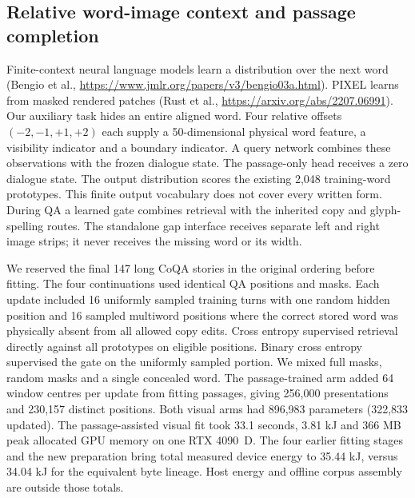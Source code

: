 \subsection*{Relative word-image context and passage completion}
Finite-context neural language models learn a distribution over the next word (Bengio et al., \url{https://www.jmlr.org/papers/v3/bengio03a.html}). PIXEL learns from masked rendered patches (Rust et al., \url{https://arxiv.org/abs/2207.06991}). Our auxiliary task hides an entire aligned word. Four relative offsets $(-2,-1,+1,+2)$ each supply a 50-dimensional physical word feature, a visibility indicator and a boundary indicator. A query network combines these observations with the frozen dialogue state. The passage-only head receives a zero dialogue state. The output distribution scores the existing 2,048 training-word prototypes. This finite output vocabulary does not cover every written form. During QA a learned gate combines retrieval with the inherited copy and glyph-spelling routes. The standalone gap interface receives separate left and right image strips; it never receives the missing word or its width.

We reserved the final 147 long CoQA stories in the original ordering before fitting. The four continuations used identical QA positions and masks. Each update included 16 uniformly sampled training turns with one random hidden position and 16 sampled multiword positions where the correct stored word was physically absent from all allowed copy edits. Cross entropy supervised retrieval directly against all prototypes on eligible positions. Binary cross entropy supervised the gate on the uniformly sampled portion. We mixed full masks, random masks and a single concealed word. The passage-trained arm added 64 window centres per update from fitting passages, giving 256,000 presentations and 230,157 distinct positions. Both visual arms had 896,983 parameters (322,833 updated). The passage-assisted visual fit took 33.1 seconds, 3.81 kJ and 366 MB peak allocated GPU memory on one RTX 4090~D. The four earlier fitting stages and the new preparation bring total measured device energy to 35.44 kJ, versus 34.04 kJ for the equivalent byte lineage. Host energy and offline corpus assembly are outside those totals.

